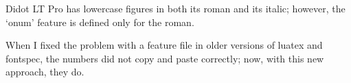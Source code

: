 \documentclass{article}
\begin{document}
Didot LT Pro has lowercase figures in both its roman and its italic;
however, the ‘onum’ feature is defined only for the roman.

When I fixed the problem with a feature file in older versions of
luatex and fontspec, the numbers did not copy and paste correctly;
now, with this new approach, they do.
\end{document}
